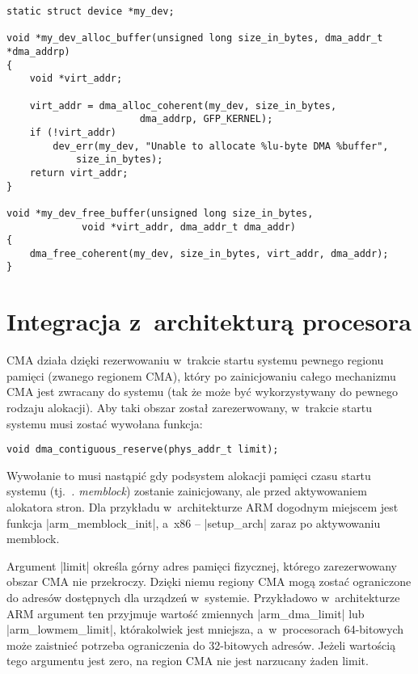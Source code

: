 \begin{lstlisting}[float=tbhp,caption={Alokacja bufora DMA z~użyciem
      DMA API.},label=lst:dma-alloc-example]
static struct device *my_dev;

void *my_dev_alloc_buffer(unsigned long size_in_bytes, dma_addr_t *dma_addrp)
{
	void *virt_addr;

	virt_addr = dma_alloc_coherent(my_dev, size_in_bytes,
				       dma_addrp, GFP_KERNEL);
	if (!virt_addr)
		dev_err(my_dev, "Unable to allocate %lu-byte DMA %buffer",
			size_in_bytes);
	return virt_addr;
}

void *my_dev_free_buffer(unsigned long size_in_bytes,
			 void *virt_addr, dma_addr_t dma_addr)
{
	dma_free_coherent(my_dev, size_in_bytes, virt_addr, dma_addr);
}
\end{lstlisting}


\section{Integracja z~architekturą procesora}\label{sec:integrate-with-arch}

CMA działa dzięki rezerwowaniu w~trakcie startu systemu pewnego
regionu pamięci (zwanego regionem CMA), który po zainicjowaniu całego
mechanizmu CMA jest zwracany do systemu (tak że może być
wykorzystywany do pewnego rodzaju alokacji).  Aby taki obszar został
zarezerwowany, w~trakcie startu systemu musi zostać wywołana funkcja:

\begin{lstlisting}
void dma_contiguous_reserve(phys_addr_t limit);
\end{lstlisting}

Wywołanie to musi nastąpić gdy podsystem alokacji pamięci czasu startu
systemu (tj.\ {\it. memblock}) zostanie zainicjowany, ale przed
aktywowaniem alokatora stron.  Dla przykładu w~architekturze ARM
dogodnym miejscem jest funkcja \code|arm_memblock_init|, a~x86
-- \code|setup_arch| zaraz po aktywowaniu memblock.

Argument \code|limit| określa górny adres pamięci fizycznej,
którego zarezerwowany obszar CMA nie przekroczy.  Dzięki niemu regiony
CMA mogą zostać ograniczone do adresów dostępnych dla urządzeń
w~systemie.  Przykładowo w~architekturze ARM argument ten przyjmuje
wartość zmiennych \code|arm_dma_limit| lub
\code|arm_lowmem_limit|, którakolwiek jest mniejsza,
a~w~procesorach 64-bitowych może zaistnieć potrzeba ograniczenia do
32-bitowych adresów.  Jeżeli wartością tego argumentu jest zero, na
region CMA nie jest narzucany żaden limit.

